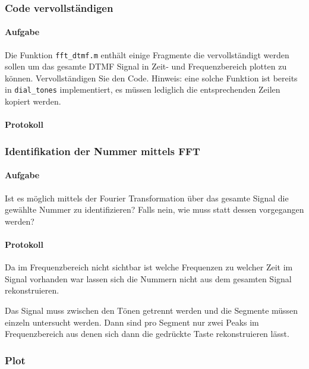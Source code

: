\documentclass[10pt]{report}
\begin{document}
        \subsubsection{Code vervollständigen}
        \paragraph{Aufgabe}
        Die Funktion \texttt{fft\_dtmf.m} enthält einige Fragmente die vervollständigt werden sollen
        um das gesamte DTMF Signal in Zeit- und Frequenzbereich plotten zu können. Vervollständigen Sie den Code. Hinweis: eine solche Funktion ist bereits in
        \texttt{dial\_tones}
        implementiert, es müssen lediglich die entsprechenden Zeilen kopiert werden.
        \paragraph{Protokoll}

        

        \subsubsection{Identifikation der Nummer mittels FFT}
        \paragraph{Aufgabe}
        Ist es möglich mittels der Fourier Transformation über das gesamte Signal die
        gewählte Nummer zu identifizieren? Falls nein, wie muss statt dessen vorgegangen werden?

        \paragraph{Protokoll}
        Da im Frequenzbereich nicht sichtbar ist welche Frequenzen zu welcher Zeit
        im Signal vorhanden war lassen sich die Nummern nicht aus dem gesamten
        Signal rekonstruieren.

        Das Signal muss zwischen den Tönen getrennt werden und die Segmente müssen
        einzeln untersucht werden. Dann sind pro Segment nur zwei Peaks im
        Frequenzbereich aus denen sich dann die gedrückte Taste rekonstruieren
        lässt.

        \subsubsection{Plot}
\end{document}
